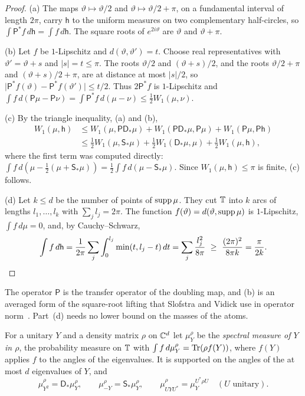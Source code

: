 \begin{proof}
(a) The maps $\vartheta\mapsto\vartheta/2$ and $\vartheta\mapsto\vartheta/2+\pi$, on a fundamental interval of length $2\pi$, carry $\mathsf h$ to
the uniform measures on two complementary half-circles, so $\int\mathsf P^*f\,d\mathsf h=\int f\,d\mathsf h$. The square roots of
$e^{2i\vartheta}$ are $\vartheta$ and $\vartheta+\pi$.

(b) Let $f$ be $1$-Lipschitz and $d(\vartheta,\vartheta')=t$. Choose real representatives with $\vartheta'=\vartheta+s$ and $\lvert
s\rvert=t\le\pi$. The roots $\vartheta/2$ and $(\vartheta+s)/2$, and the roots $\vartheta/2+\pi$ and $(\vartheta+s)/2+\pi$, are at distance at
most $\lvert s\rvert/2$, so $\lvert\mathsf P^*f(\vartheta)-\mathsf P^*f(\vartheta')\rvert\le t/2$. Thus $2\mathsf P^*f$ is $1$-Lipschitz and
$\int f\,d(\mathsf P\mu-\mathsf P\nu)=\int\mathsf P^*f\,d(\mu-\nu)\le\frac12W_1(\mu,\nu)$.

(c) By the triangle inequality, (a) and (b),
\begin{align*}
W_1(\mu,\mathsf h)&\le W_1(\mu,\mathsf P\mathsf D_*\mu)+W_1(\mathsf P\mathsf D_*\mu,\mathsf P\mu)+W_1(\mathsf P\mu,\mathsf P\mathsf h)\\
&\le\tfrac12W_1(\mu,\mathsf S_*\mu)+\tfrac12W_1(\mathsf D_*\mu,\mu)+\tfrac12W_1(\mu,\mathsf h),
\end{align*}
where the first term was computed directly: $\int f\,d(\mu-\frac12(\mu+\mathsf S_*\mu))=\frac12\int f\,d(\mu-\mathsf S_*\mu)$. Since
$W_1(\mu,\mathsf h)\le\pi$ is finite, (c) follows.

(d) Let $k\le d$ be the number of points of $\operatorname{supp}\mu$. They cut $\mathbb T$ into $k$ arcs of lengths $l_1,\dots,l_k$ with $\sum_jl_j=2\pi$. The function
$f(\vartheta)=d(\vartheta,\operatorname{supp}\mu)$ is $1$-Lipschitz, $\int f\,d\mu=0$, and, by Cauchy--Schwarz,
\[
\int f\,d\mathsf h=\frac1{2\pi}\sum_j\int_0^{l_j}\min(t,l_j-t)\,dt=\sum_j\frac{l_j^2}{8\pi}\ \ge\ \frac{(2\pi)^2}{8\pi k}=\frac\pi{2k}. \qedhere
\]
\end{proof}

The operator $\mathsf P$ is the transfer operator of the doubling map, and (b) is an averaged form of the square-root lifting that Slofstra
and Vidick use in operator norm~\cite[Claims~3.6 and~3.7]{SV18}. Part~(d) needs no lower bound on the masses of the atoms.

For a unitary $Y$ and a density matrix $\rho$ on $\mathbb C^d$ let $\mu^\rho_Y$ be the \emph{spectral measure of $Y$ in $\rho$}, the probability
measure on $\mathbb T$ with $\int f\,d\mu^\rho_Y=\operatorname{Tr}(\rho f(Y))$, where $f(Y)$ applies $f$ to the angles of the eigenvalues. It is supported on
the angles of the at most $d$ eigenvalues of $Y$, and
\begin{equation}\label{eq:rates-spectral}
\mu^\rho_{Y^2}=\mathsf D_*\mu^\rho_Y,\qquad\mu^\rho_{-Y}=\mathsf S_*\mu^\rho_Y,\qquad\mu^\rho_{UYU^*}=\mu^{U^*\rho U}_Y\quad(U\text{ unitary}).
\end{equation}

